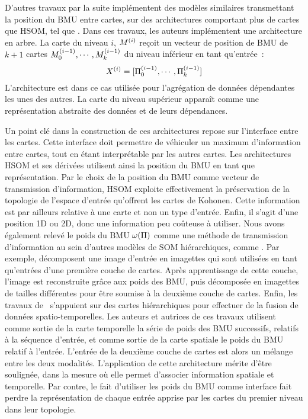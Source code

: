 \documentclass[../main]{subfiles}
\begin{document}
D'autres travaux par la suite implémentent des modèles similaires transmettant la position du BMU entre cartes, sur des architectures comportant plus de cartes que HSOM, tel que \cite{Paplinski2005MultimodalFS, hagenauer_hierarchical_2013 }.
Dans ces travaux, les auteurs implémentent une architecture en arbre. La carte du niveau $i$, $M^{({i})}$ reçoit un vecteur de position de BMU de $k+1$ cartes $M_0^{({i-1})}, \cdots, M_k^{({i-1})}$  du niveau inférieur en tant qu'entrée~:
$$ X^{({i})} = [\Pi_0^{({i-1})}, \cdots, \Pi_k^{({i-1})}]$$
L'architecture est dans ce cas utilisée pour l'agrégation de données dépendantes les unes des autres.
La carte du niveau supérieur apparaît comme une représentation abstraite des données et de leurs dépendances.

Un point clé dans la construction de ces architectures repose sur l'interface entre les cartes. 
Cette interface doit permettre de véhiculer un maximum d'information entre cartes, tout en étant interprétable par les autres cartes.
Les architectures HSOM et ses dérivées utilisent ainsi la position du BMU en tant que représentation.
Par le choix de la position du BMU comme vecteur de transmission d'information, HSOM exploite effectivement la préservation de la topologie de l'espace d'entrée qu'offrent les cartes de Kohonen.
Cette information est par ailleurs relative à une carte et non un type d'entrée. Enfin, il s'agit d'une position 1D ou 2D, donc une information peu coûteuse à utiliser.
Nous avons également relevé le poids du BMU $\omega(\Pi)$ comme une méthode de transmission d'information au sein d'autres modèles de SOM hiérarchiques, comme \cite{wang_comparisonal_2007, gunes_kayacik_hierarchical_2007, dozono_convolutional_2016}.
Par exemple, \cite{dozono_convolutional_2016} décomposent une image d'entrée en imagettes qui sont utilisées en tant qu'entrées d'une première couche de cartes. 
Après apprentissage de cette couche, l'image est reconstruite grâce aux poids des BMU, puis décomposée en imagettes de tailles différentes pour être soumise à la deuxième couche de cartes.
Enfin, les travaux de~\cite{mici_self-organizing_2018} s'appuient sur des cartes hiérarchiques pour effectuer de la fusion de données spatio-temporelles.
Les auteurs et autrices de ces travaux utilisent comme sortie de la carte temporelle la série de poids des BMU successifs, relatifs à la séquence d'entrée, et comme sortie de la carte spatiale le poids du BMU relatif à l'entrée. L'entrée de la deuxième couche de cartes est alors un mélange entre les deux modalités. 
L'application de cette architecture mérite d'être soulignée, dans la mesure où elle permet d'associer information spatiale et temporelle. Par contre, le fait d'utiliser les poids du BMU comme interface fait perdre la représentation de chaque entrée apprise par les cartes du premier niveau dans leur topologie.
\end{document}
